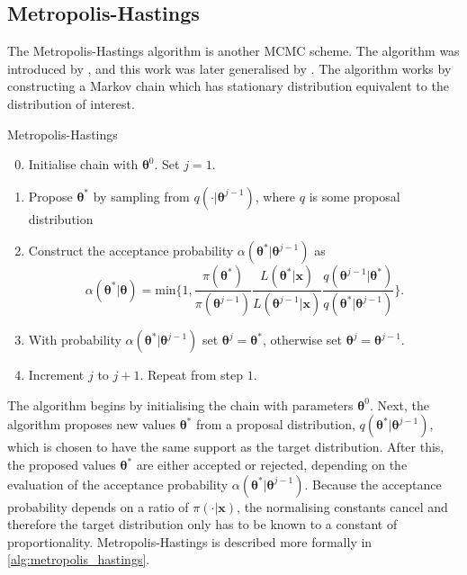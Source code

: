 \subsection{Metropolis-Hastings}
\label{ssec:metropolis_hastings}
The Metropolis-Hastings algorithm is another MCMC scheme. The algorithm was introduced by \cite{metropolis53}, and this work was later generalised by \cite{hastings70}. The algorithm works by constructing a Markov chain which has stationary distribution equivalent to the distribution of interest.
\begin{algorithm}
	\caption{Metropolis-Hastings}
	\label{alg:metropolis_hastings}
	\begin{enumerate}
	    \setcounter{enumi}{-1}
	    \item Initialise chain with $\bm{\theta}^{0}$. Set $j=1$.
	    \item Propose ${\bm{\theta}}^*$ by sampling from $q(\cdot | {\bm{\theta}}^{j-1})$, where $q$ is some proposal distribution
	    \item Construct the acceptance probability $\alpha({\bm{\theta}}^* | {\bm{\theta}^{j-1}})$ as
	    \begin{equation*}
			\alpha({\bm{\theta}}^* | \bm{\theta}) = \text{min}\bigg\{ 1, \frac{\pi({\bm{\theta}}^*)}{\pi({\bm{\theta}}^{j-1})} \frac{L(\bm{\theta}^* | \bm{x})}{L({\bm{\theta}}^{j-1} | \bm{x})} \frac{q({\bm{\theta}}^{j-1} | {\bm{\theta}}^*)}{q({\bm{\theta}}^* | {\bm{\theta}}^{j-1})} \bigg\}.
	    \end{equation*}
	    \item With probability $\alpha({\bm{\theta}}^* | {\bm{\theta}^{j-1}})$ set ${\bm{\theta}}^j = {\bm{\theta}}^*$, otherwise set ${\bm{\theta}}^j = {\bm{\theta}}^{j-1}$.
	    \item Increment $j$ to $j+1$. Repeat from step $1$.
	\end{enumerate}
\end{algorithm}

The algorithm begins by initialising the chain with parameters $\bm{\theta}^{0}$. Next, the algorithm proposes new values ${\bm{\theta}}^*$ from a proposal distribution, $q(\bm{\theta}^* | {\bm{\theta}}^{j-1})$, which is chosen to have the same support as the target distribution. After this, the proposed values ${\bm{\theta}}^*$ are either accepted or rejected, depending on the evaluation of the acceptance probability $\alpha({\bm{\theta}}^* | {\bm{\theta}^{j-1}})$. Because the acceptance probability depends on a ratio of $\pi(\cdot | \bm{x})$, the normalising constants cancel and therefore the target distribution only has to be known to a constant of proportionality. Metropolis-Hastings is described more formally in \cref{alg:metropolis_hastings}.

